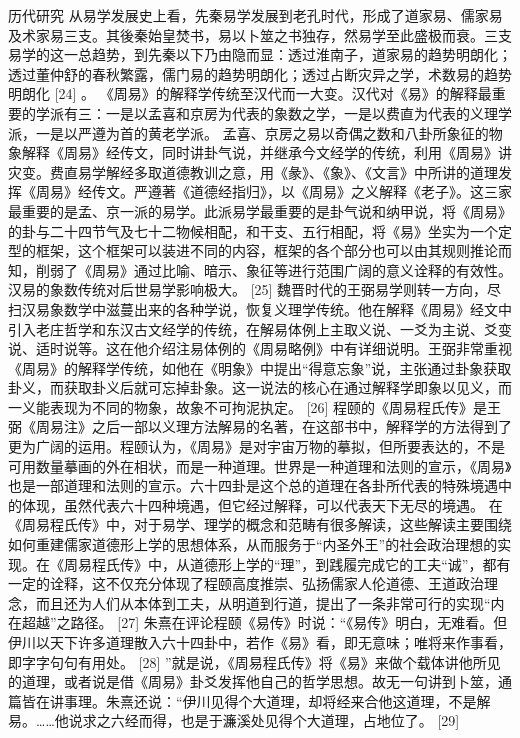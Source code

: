 \documentclass[12pt,UTF8]{ctexbook}
\begin{document}
历代研究
从易学发展史上看，先秦易学发展到老孔时代，形成了道家易、儒家易及术家易三支。其後秦始皇焚书，易以卜筮之书独存，然易学至此盛极而衰。三支易学的这一总趋势，到先秦以下乃由隐而显：透过淮南子，道家易的趋势明朗化；透过董仲舒的春秋繁露，儒门易的趋势明朗化；透过占断灾异之学，术数易的趋势明朗化 [24]
。
《周易》的解释学传统至汉代而一大变。汉代对《易》的解释最重要的学派有三：一是以孟喜和京房为代表的象数之学，一是以费直为代表的义理学派，一是以严遵为首的黄老学派。
孟喜、京房之易以奇偶之数和八卦所象征的物象解释《周易》经传文，同时讲卦气说，并继承今文经学的传统，利用《周易》讲灾变。费直易学解经多取道德教训之意，用《彖》、《象》、《文言》中所讲的道理发挥《周易》经传文。严遵著《道德经指归》，以《周易》之义解释《老子》。这三家最重要的是孟、京一派的易学。此派易学最重要的是卦气说和纳甲说，将《周易》的卦与二十四节气及七十二物候相配，和干支、五行相配，将《易》坐实为一个定型的框架，这个框架可以装进不同的内容，框架的各个部分也可以由其规则推论而知，削弱了《周易》通过比喻、暗示、象征等进行范围广阔的意义诠释的有效性。汉易的象数传统对后世易学影响极大。 [25]
魏晋时代的王弼易学则转一方向，尽扫汉易象数学中滋蔓出来的各种学说，恢复义理学传统。他在解释《周易》经文中引入老庄哲学和东汉古文经学的传统，在解易体例上主取义说、一爻为主说、爻变说、适时说等。这在他介绍注易体例的《周易略例》中有详细说明。王弼非常重视《周易》的解释学传统，如他在《明象》中提出“得意忘象”说，主张通过卦象获取卦义，而获取卦义后就可忘掉卦象。这一说法的核心在通过解释学即象以见义，而一义能表现为不同的物象，故象不可拘泥执定。 [26]
程颐的《周易程氏传》是王弼《周易注》之后一部以义理方法解易的名著，在这部书中，解释学的方法得到了更为广阔的运用。程颐认为，《周易》是对宇宙万物的摹拟，但所要表达的，不是可用数量摹画的外在相状，而是一种道理。世界是一种道理和法则的宣示，《周易》也是一部道理和法则的宣示。六十四卦是这个总的道理在各卦所代表的特殊境遇中的体现，虽然代表六十四种境遇，但它经过解释，可以代表天下无尽的境遇。
在《周易程氏传》中，对于易学、理学的概念和范畴有很多解读，这些解读主要围绕如何重建儒家道德形上学的思想体系，从而服务于“内圣外王”的社会政治理想的实现。在《周易程氏传》中，从道德形上学的“理”，到践履完成它的工夫“诚”，都有一定的诠释，这不仅充分体现了程颐高度推崇、弘扬儒家人伦道德、王道政治理念，而且还为人们从本体到工夫，从明道到行道，提出了一条非常可行的实现“内在超越”之路径。 [27]
朱熹在评论程颐《易传》时说：“《易传》明白，无难看。但伊川以天下许多道理散入六十四卦中，若作《易》看，即无意味；唯将来作事看，即字字句句有用处。 [28] ”就是说，《周易程氏传》将《易》来做个载体讲他所见的道理，或者说是借《周易》卦爻发挥他自己的哲学思想。故无一句讲到卜筮，通篇皆在讲事理。朱熹还说：“伊川见得个大道理，却将经来合他这道理，不是解易。……他说求之六经而得，也是于濂溪处见得个大道理，占地位了。 [29]
\end{document}
